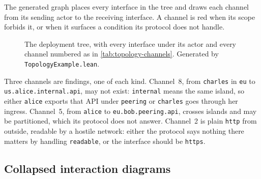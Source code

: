 The generated graph places every interface in the tree and draws each channel
from its sending actor to the receiving interface. A channel is red when its
scope forbids it, or when it surfaces a condition its protocol does not handle.

\begin{figure}[htbp]
\centering
{}
\caption{The deployment tree, with every interface under its actor and every
channel numbered as in \cref{tab:topology-channels}. Generated by
\texttt{TopologyExample.lean}.}
\label{fig:topology-graph}
\end{figure}

\begin{table}[htbp]
\centering
\small

\caption{Each channel's reachability and the conditions it surfaces, against
what its protocol handles.}
\label{tab:topology-channels}
\end{table}

Three channels are findings, one of each kind. Channel~8, from \texttt{charles}
in \texttt{eu} to \texttt{us.alice.internal.api}, may not exist:
\texttt{internal} means the same island, so either \texttt{alice} exports that
API under \texttt{peering} or \texttt{charles} goes through her ingress.
Channel~5, from \texttt{alice} to \texttt{eu.bob.peering.api}, crosses islands
and may be partitioned, which its protocol does not answer. Channel~2 is plain
\texttt{http} from outside, readable by a hostile network: either the protocol
says nothing there matters by handling \texttt{readable}, or the interface should
be \texttt{https}.

\subsection{Collapsed interaction diagrams}

